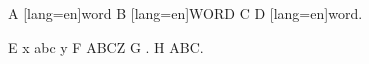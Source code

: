 \documentclass{article}
\def\foo{abc}
\begin{document}
A \MakeUppercase[lang=en]{word} B \MakeLowercase[lang=en]{WORD} C 
D \MakeTextUppercase[lang=en]{word}.

E \MakeLowercase{X \MakeUppercase\foo{} Y} F \MakeUppercase{\MakeLowercase\foo Z} G \capfoo. H \edef\y{\MakeUppercase{abc}}\y.
\end{document}
